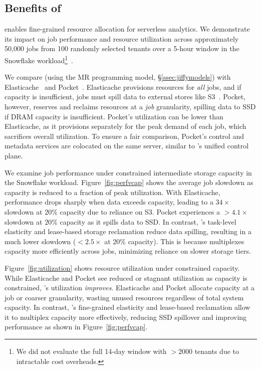 \subsection{Benefits of \jiffy}
\label{ssec:overallbenefits}

\jiffy enables fine-grained resource allocation for serverless analytics. We demonstrate its impact on job performance and resource utilization across approximately 50,000 jobs from 100 randomly selected tenants over a 5-hour window in the Snowflake workload\footnote{We did not evaluate the full 14-day window with $>2000$ tenants due to intractable cost overheads.}~\cite{snowset}.

We compare \jiffy (using the MR programming model, \S\ref{ssec:jiffymodels}) with Elasticache~\cite{elasticache} and Pocket~\cite{pocket}. Elasticache provisions resources for \textit{all} jobs, and if capacity is insufficient, jobs must spill data to external stores like S3~\cite{s3}. Pocket, however, reserves and reclaims resources at a \textit{job} granularity, spilling data to SSD if DRAM capacity is insufficient. Pocket’s utilization can be lower than Elasticache, as it provisions separately for the peak demand of each job, which sacrifices overall utilization. To ensure a fair comparison, Pocket’s control and metadata services are colocated on the same server, similar to \jiffy’s unified control plane.

 We examine job performance under constrained intermediate storage capacity in the Snowflake workload. Figure~\ref{fig:perfvcap} shows the average job slowdown as capacity is reduced to a fraction of peak utilization. With Elasticache, performance drops sharply when data exceeds capacity, leading to a $34\times$ slowdown at 20\% capacity due to reliance on S3. Pocket experiences a $>4.1\times$ slowdown at 20\% capacity as it spills data to SSD. In contrast, \jiffy’s task-level elasticity and lease-based storage reclamation reduce data spilling, resulting in a much lower slowdown ($<2.5\times$ at 20\% capacity). This is because \jiffy multiplexes capacity more efficiently across jobs, minimizing reliance on slower storage tiers.

 Figure~\ref{fig:utilization} shows resource utilization under constrained capacity. While Elasticache and Pocket see reduced or stagnant utilization as capacity is constrained, \jiffy’s utilization \textit{improves}. Elasticache and Pocket allocate capacity at a job or coarser granularity, wasting unused resources regardless of total system capacity. In contrast, \jiffy’s fine-grained elasticity and lease-based reclamation allow it to multiplex capacity more effectively, reducing SSD spillover and improving performance as shown in Figure~\ref{fig:perfvcap}.


